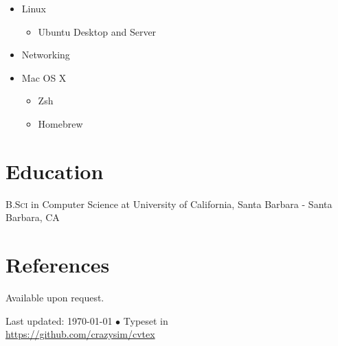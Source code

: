 \documentclass[10pt,a4paper]{article}
\newcommand{\years}[1]{\marginnote{#1}}
\begin{document}
\begin{itemize}
    \item Linux
        \begin{itemize}
            \item Ubuntu Desktop and Server
        \end{itemize}
    \item Networking
    \item Mac OS X
        \begin{itemize}
            \item Zsh
            \item Homebrew
        \end{itemize}
\end {itemize}

\section*{Education}

\years{2008-2012}\textsc{B.Sci} in Computer Science at University of California, Santa Barbara - Santa Barbara, CA

\section*{References}

Available upon request.

\vfill{}

\begin{center}
{\scriptsize  Last updated: \today\- $\bullet$\- 
Typeset in \href{http://nitens.org/taraborelli/cvtex}{\XeTeX}\\
\href{https://github.com/crazysim/cvtex}{https://github.com/crazysim/cvtex}}
\end{center}
\end{document}
